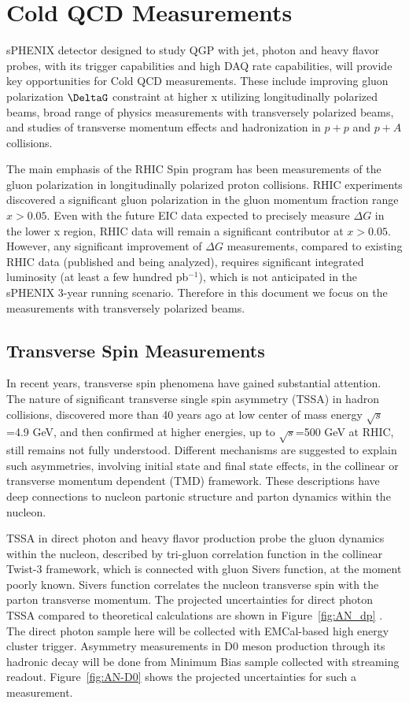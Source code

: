\section{Cold QCD Measurements}
\label{sec:ColdQCD}

sPHENIX detector designed to study QGP with jet, photon and heavy flavor probes, with its trigger capabilities and high DAQ rate capabilities, will provide key opportunities for Cold QCD measurements. These include improving gluon polarization $\DeltaG$ constraint at higher x utilizing longitudinally polarized beams, broad range of physics measurements with transversely polarized beams, and studies of transverse momentum effects and hadronization in $p+p$ and $p+A$ collisions.

The main emphasis of the RHIC Spin program has been measurements of the gluon polarization in longitudinally polarized proton collisions. RHIC experiments discovered a significant gluon polarization in the gluon momentum fraction range $x>0.05$. Even with the future EIC data expected to precisely measure $\Delta G$ in the lower x region, RHIC data will remain a significant contributor at $x>0.05$. However, any significant improvement of $\Delta G$ measurements, compared to existing RHIC data (published and being analyzed), requires significant integrated luminosity (at least a few hundred pb$^{-1}$), which is not anticipated in the sPHENIX 3-year running scenario. Therefore in this document we focus on the measurements with transversely polarized beams.

\subsection {Transverse Spin Measurements}

In recent years, transverse spin phenomena have gained substantial attention. The nature of significant transverse single spin asymmetry (TSSA) in hadron collisions, discovered more than 40 years ago at low center of mass energy $\sqrt{s}$=4.9 GeV, and then confirmed at higher energies, up to $\sqrt{s}$=500 GeV at RHIC, still remains not fully understood. Different mechanisms are suggested to explain such asymmetries, involving initial state and final state effects, in the collinear or transverse momentum dependent (TMD) framework. These descriptions have deep connections to nucleon partonic structure and parton dynamics within the nucleon.

TSSA in direct photon and heavy flavor production probe the gluon dynamics within the nucleon, described by tri-gluon correlation function in the collinear Twist-3 framework, which is connected with gluon Sivers function, at the moment poorly known. Sivers function correlates the nucleon transverse spin with the parton transverse
momentum. The projected uncertainties for direct photon TSSA compared to theoretical calculations are shown in Figure~\ref{fig:AN_dp} . The direct photon sample here will be collected with EMCal-based high energy cluster trigger. Asymmetry measurements in D0 meson production through its hadronic decay will be done from Minimum Bias sample collected with streaming readout. Figure~\ref{fig:AN-D0} shows the projected uncertainties for such a measurement.

